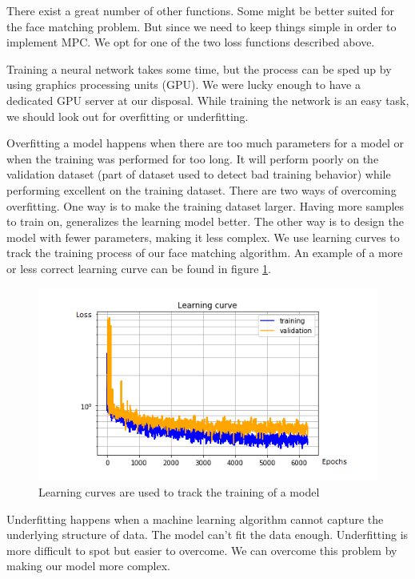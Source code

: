 There exist a great number of other functions. Some might be better suited for the face matching problem. But since we need to keep things simple in order to implement MPC. We opt for one of the two loss functions described above.

Training a neural network takes some time, but the process can be sped up by using graphics processing units (GPU). We were lucky enough to have a dedicated GPU server at our disposal. While training the network is an easy task, we should look out for overfitting or underfitting.

Overfitting a model happens when there are too much parameters for a model or when the training was performed for too long. It will perform poorly on the validation dataset (part of dataset used to detect bad training behavior) while performing excellent on the training dataset. There are two ways of overcoming overfitting. One way is to make the training dataset larger. Having more samples to train on, generalizes the learning model better. The other way is to design the model with fewer parameters, making it less complex. We use learning curves to track the training process of our face matching algorithm. An example of a more or less correct learning curve can be found in figure \ref{fig:trainingcurve}.

\begin{figure}[H]
  \includegraphics{fig/trainingcurve.png}
  \caption{Learning curves are used to track the training of a model}
  \label{fig:trainingcurve}
\end{figure}

Underfitting happens when a machine learning algorithm cannot capture the underlying structure of data. The model can't fit the data enough. Underfitting is more difficult to spot but easier to overcome. We can overcome this problem by making our model more complex.

